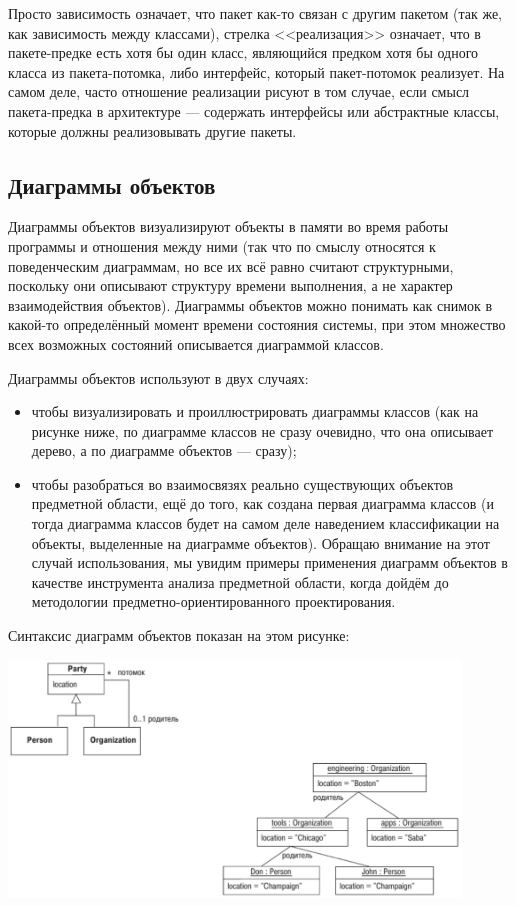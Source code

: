 \documentclass{../text-style}
\begin{document}
Просто зависимость означает, что пакет как-то связан с другим пакетом (так же, как зависимость между классами), стрелка <<реализация>> означает, что в пакете-предке есть хотя бы один класс, являющийся предком хотя бы одного класса из пакета-потомка, либо интерфейс, который пакет-потомок реализует. На самом деле, часто отношение реализации рисуют в том случае, если смысл пакета-предка в архитектуре --- содержать интерфейсы или абстрактные классы, которые должны реализовывать другие пакеты.

\subsection{Диаграммы объектов}

Диаграммы объектов визуализируют объекты в памяти во время работы программы и отношения между ними (так что по смыслу относятся к поведенческим диаграммам, но все их всё равно считают структурными, поскольку они описывают структуру времени выполнения, а не характер взаимодействия объектов). Диаграммы объектов можно понимать как снимок в какой-то определённый момент времени состояния системы, при этом множество всех возможных состояний описывается диаграммой классов.

Диаграммы объектов используют в двух случаях:

\begin{itemize}
    \item чтобы визуализировать и проиллюстрировать диаграммы классов (как на рисунке ниже, по диаграмме классов не сразу очевидно, что она описывает дерево, а по диаграмме объектов --- сразу);
    \item чтобы разобраться во взаимосвязях реально существующих объектов предметной области, ещё до того, как создана первая диаграмма классов (и тогда диаграмма классов будет на самом деле наведением классификации на объекты, выделенные на диаграмме объектов). Обращаю внимание на этот случай использования, мы увидим примеры применения диаграмм объектов в качестве инструмента анализа предметной области, когда дойдём до методологии предметно-ориентированного проектирования.
\end{itemize}

Синтаксис диаграмм объектов показан на этом рисунке:

\begin{center}
    \includegraphics[width=0.9\textwidth]{objectDiagrams.png}
\end{center}
\end{document}
